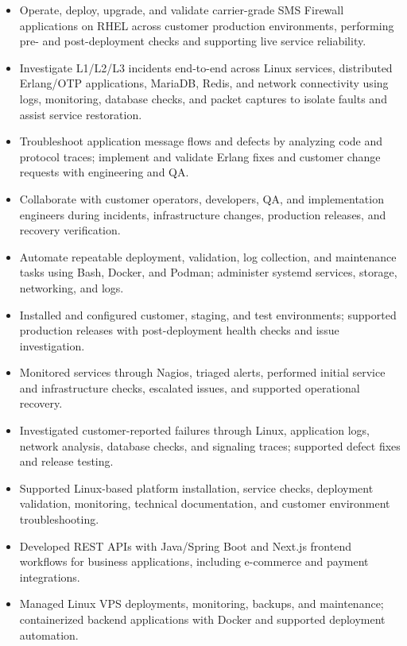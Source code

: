 \begin{itemize}
\item Operate, deploy, upgrade, and validate carrier-grade SMS Firewall applications on
RHEL across customer production environments, performing pre- and post-deployment checks
and supporting live service reliability.
\item Investigate L1/L2/L3 incidents end-to-end across Linux services, distributed Erlang/OTP
applications, MariaDB, Redis, and network connectivity using logs, monitoring, database
checks, and packet captures to isolate faults and assist service restoration.
\item Troubleshoot application message flows and defects by analyzing code and protocol
traces; implement and validate Erlang fixes and customer change requests with engineering and QA.
\item Collaborate with customer operators, developers, QA, and implementation engineers
during incidents, infrastructure changes, production releases, and recovery verification.
\item Automate repeatable deployment, validation, log collection, and maintenance tasks
using Bash, Docker, and Podman; administer systemd services, storage, networking, and logs.
\end{itemize}
\begin{itemize}
\item Installed and configured customer, staging, and test environments; supported
production releases with post-deployment health checks and issue investigation.
\item Monitored services through Nagios, triaged alerts, performed initial service and
infrastructure checks, escalated issues, and supported operational recovery.
\item Investigated customer-reported failures through Linux, application logs,
network analysis, database checks, and signaling traces; supported defect fixes and release testing.
\end{itemize}
\begin{itemize}
\item Supported Linux-based platform installation, service checks, deployment validation,
monitoring, technical documentation, and customer environment troubleshooting.
\end{itemize}
\begin{itemize}
\item Developed REST APIs with Java/Spring Boot and Next.js frontend workflows for
business applications, including e-commerce and payment integrations.
\item Managed Linux VPS deployments, monitoring, backups, and maintenance; containerized
backend applications with Docker and supported deployment automation.
\end{itemize}
